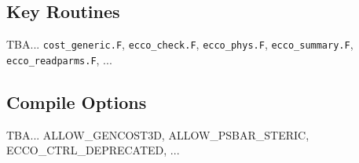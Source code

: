 \subsection{Key Routines}

TBA... \texttt{cost\_generic.F}, \texttt{ecco\_check.F}, \texttt{ecco\_phys.F}, \texttt{ecco\_summary.F}, \texttt{ecco\_readparms.F}, ...

\subsection{Compile Options}

TBA... ALLOW\_GENCOST3D, ALLOW\_PSBAR\_STERIC, ECCO\_CTRL\_DEPRECATED, ...
